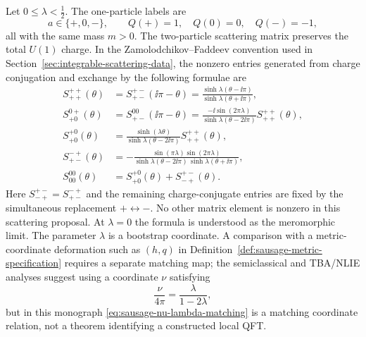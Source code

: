 \begin{definition}
\label{def:repulsive-massive-sausage-scattering}
Let \(0\le\lambda<\frac12\).  The one-particle labels are
\[
  a\in\{+,0,-\},
  \qquad Q(+)=1,\quad Q(0)=0,\quad Q(-)=-1,
\]
all with the same mass \(m>0\).  The two-particle scattering matrix preserves
the total \(U(1)\) charge.  In the Zamolodchikov--Faddeev convention used in
Section~\ref{sec:integrable-scattering-data}, the nonzero entries generated
from charge conjugation and exchange by the following formulae are
\begin{align}
  S_{++}^{++}(\theta)
  &=
  S_{+-}^{+-}(\ii\pi-\theta)
  =
  \frac{\sinh\lambda(\theta-\ii\pi)}
       {\sinh\lambda(\theta+\ii\pi)},
  \label{eq:sausage-spp}\\
  S_{+0}^{0+}(\theta)
  &=
  S_{+-}^{00}(\ii\pi-\theta)
  =
  \frac{-\ii\sin(2\pi\lambda)}
       {\sinh\lambda(\theta-2\ii\pi)}
  S_{++}^{++}(\theta),
  \label{eq:sausage-sp0-flip}\\
  S_{+0}^{+0}(\theta)
  &=
  \frac{\sinh(\lambda\theta)}
       {\sinh\lambda(\theta-2\ii\pi)}
  S_{++}^{++}(\theta),
  \label{eq:sausage-sp0-direct}\\
  S_{+-}^{-+}(\theta)
  &=
  -\frac{\sin(\pi\lambda)\sin(2\pi\lambda)}
        {\sinh\lambda(\theta-2\ii\pi)\,
         \sinh\lambda(\theta+\ii\pi)},
  \label{eq:sausage-spm-exchange}\\
  S_{00}^{00}(\theta)
  &=
  S_{+0}^{+0}(\theta)+S_{-+}^{+-}(\theta).
  \label{eq:sausage-s00}
\end{align}
Here \(S_{-+}^{+-}=S_{+-}^{-+}\) and the remaining charge-conjugate entries
are fixed by the simultaneous replacement \(+\leftrightarrow-\).  No other
matrix element is nonzero in this scattering proposal.
At \(\lambda=0\) the formula is understood as the meromorphic limit.  The
parameter \(\lambda\) is a bootstrap coordinate.  A comparison with a
metric-coordinate deformation such as \((h,q)\) in
Definition~\ref{def:sausage-metric-specification} requires a separate
matching map;
the semiclassical and TBA/NLIE analyses suggest using a coordinate
\(\nu\) satisfying
\begin{equation}
  \frac{\nu}{4\pi}=\frac{\lambda}{1-2\lambda},
  \label{eq:sausage-nu-lambda-matching}
\end{equation}
but in this monograph \eqref{eq:sausage-nu-lambda-matching} is a matching
coordinate relation, not a theorem identifying a constructed local QFT.
\end{definition}

